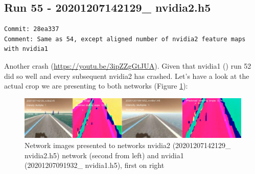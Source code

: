 \subsection{Run 55 - 20201207142129\_ nvidia2.h5}
\begin{verbatim}
Commit: 28ea337
Comment: Same as 54, except aligned number of nvidia2 feature maps with nvidia1
\end{verbatim}
Another crash (\url{https://youtu.be/3ipZZgGtJUA}). Given that nvidia1 () run 52 did so well and every subsequent nvidia2 has crashed. Let's have a look at the actual crop we are presenting to both networks (Figure \ref{fig:2129x1932crops}):
 
\begin{figure}[ht]
 \centering 
 \includegraphics[width=\textwidth]{Figures/2129x1932crops.png}
 \caption{Network images presented to networks nvidia2 (20201207142129\_ nvidia2.h5) network (second from left) and nvidia1 (20201207091932\_ nvidia1.h5), first on right}
 \label{fig:2129x1932crops}
\end{figure}

